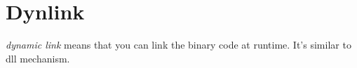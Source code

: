 \section{Dynlink}

\textit{dynamic link} means that you can link the binary code at
runtime. It's similar to dll mechanism.
